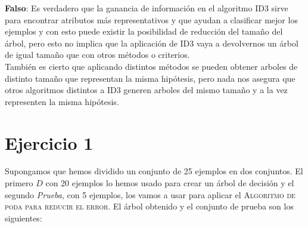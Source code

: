\documentclass{article}
\begin{document}
\textbf{Falso}: Es verdadero que la ganancia de información en el algoritmo ID3 sirve para encontrar atributos más representativos y que ayudan a clasificar mejor los ejemplos y con esto puede existir la posibilidad de reducción del tamaño del árbol, pero esto no implica que la aplicación de ID3 vaya a devolvernos un árbol de igual tamaño que con otros métodos o criterios.\\
También es cierto que aplicando distintos métodos se pueden obtener arboles de distinto tamaño que representan la misma hipótesis, pero nada nos asegura que otros algoritmos distintos a ID3 generen arboles del mismo tamaño y a la vez representen la misma hipótesis.

\section*{Ejercicio 1}
Supongamos que hemos dividido un conjunto de 25 ejemplos en dos conjuntos. El primero $D$ con 20 ejemplos lo hemos usado para crear un árbol de decisión y el segundo \emph{Prueba}, con 5 ejemplos, los vamos a usar para aplicar el \textsc{Algoritmo de poda para reducir el error}. El árbol obtenido y el conjunto de prueba son los siguientes:\\
\end{document}
